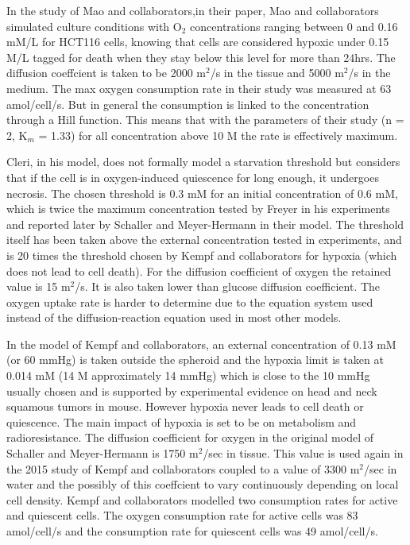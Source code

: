 \documentclass[11pt,a4paper]{article}
\begin{document}
In the study of Mao and collaborators,in their paper, Mao and collaborators simulated culture conditions with O$_{2}$ concentrations ranging between 0 and 0.16 mM/L for HCT116 cells, knowing that cells are considered hypoxic under 0.15 \textmu M/L tagged for death when they stay below this level for more than 24hrs. The diffusion coeffcient is taken to be 2000 \textmu m$^2$/s in the tissue and 5000 \textmu m$^2$/s in the medium. The max oxygen consumption rate in their study was measured at 63 amol/cell/s. But in general the consumption is linked to the concentration through a Hill function. This means that with the parameters of their study (n = 2, K$_m$ = 1.33) for all concentration above 10 \textmu M the rate is effectively maximum.

Cleri, in his model, does not formally model a starvation threshold but considers that if the cell is in oxygen-induced quiescence for long enough, it undergoes necrosis. The chosen threshold is 0.3 mM for an initial concentration of 0.6 mM, which is twice the maximum concentration tested by Freyer in his experiments and reported later by Schaller and Meyer-Hermann in their model. The threshold itself has been taken above the external concentration tested in experiments, and is 20 times the threshold chosen by Kempf and collaborators for hypoxia (which does not lead to cell death). For the diffusion coefficient of oxygen the retained value is 15 \textmu m$^2$/s. It is also taken lower than glucose diffusion coefficient. The oxygen uptake rate is harder to determine due to the equation system used instead of the diffusion-reaction equation used in most other models.

In the model of Kempf and collaborators, an external concentration of 0.13 mM (or 60 mmHg) is taken outside the spheroid and the hypoxia limit is taken at 0.014 mM (14 \textmu M approximately 14 mmHg) which is close to the 10 mmHg usually chosen and is supported by experimental evidence on head and neck squamous tumors in mouse. However hypoxia never leads to cell death or quiescence. The main impact of hypoxia is set to be on metabolism and radioresistance. The diffusion coefficient for oxygen in the original model of Schaller and Meyer-Hermann is 1750 \textmu m$^2$/sec in tissue. This value is used again in the 2015 study of Kempf and collaborators coupled to a value of 3300 \textmu m$^2$/sec in water and the possibly of this coeffcient to vary continuously depending on local cell density. Kempf and collaborators modelled two consumption rates for active and quiescent cells. The oxygen consumption rate for active cells was 83 amol/cell/s and the consumption rate for quiescent cells was 49 amol/cell/s.
\end{document}
